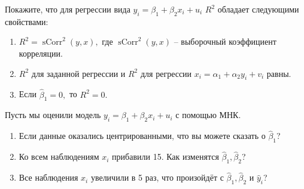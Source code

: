 \documentclass[12pt]{article}
\DeclareMathOperator{\sCorr}{sCorr}
\newcommand{\hb}{\hat{\beta}}
\newcommand{\hy}{\hat{y}}
\begin{document}
\begin{problem}
    Покажите, что для регрессии вида $y_i = \beta_1 + \beta_2 x_i + u_i$ $R^2$ обладает следующими свойствами:

    \begin{enumerate}
    \item $R^2 = \sCorr^2(y, x), $ где $\sCorr^2(y, x)$ -- выборочный коэффициент корреляции.

    \item $R^2$ для заданной регрессии и $R^2$ для регрессии $x_i = \alpha_1 + \alpha_2 y_i + v_i$ равны.

    \item Если $\hb_1 = 0,$ то $R^2 = 0.$    
    \end{enumerate}
    
\end{problem}

\begin{problem}
    Пусть мы оценили модель $y_i = \beta_1 + \beta_2 x_i + u_i$ с помощью МНК.

    \begin{enumerate}
    \item Если данные оказались центрированными, что вы можете сказать о $\hb_1$?
    \item Ко всем наблюдениям $x_i$ прибавили 15. Как изменятся $\hb_1, \hb_2$?
    \item Все наблюдения $x_i$ увеличили в 5 раз, что произойдёт с $\hb_1, \hb_2$ и $\hy_i$?
    \end{enumerate}
\end{problem}
\end{document}

